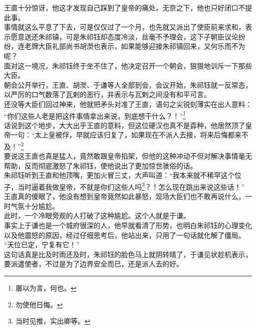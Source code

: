 \begin{multicols}{\theparacolNo}
王直十分惊讶，他这才发现自己踩到了皇帝的痛处，无奈之下，他也只好闭口不提此事。\\

事情就这么平息了下去，可是仅仅过了一个月，也先就又派出了使臣前来求和，表示愿意送还朱祁镇，可是朱祁钰却态度冷淡，丝毫不予理会，这下子朝臣议论纷纷，连老牌大臣礼部尚书胡濙也表示，如果能够迎接朱祁镇回来，又何乐而不为呢？\\

面对这一境况，朱祁钰终于坐不住了，他决定召开一个朝会，狠狠地训斥一下那些大臣。\\

朝会公开举行，王直、胡濙、于谦等人全部到会，会议开始，朱祁钰就一反常态，以严厉的口气数落了瓦剌的恶行，并表示与瓦剌之间没有和平可言。\\

还没等大臣们回过神来，他就把矛头对准了王直，语句之尖锐刻薄实在出人意料：\\

“你们这些人老是把这件事情拿出来说，到底想干什么？！”\footnote{屡以为言，何也。}\\

话说到这个地步，大大出乎王直的意料，但这位硬汉也真不是孬种，他居然顶了皇帝一句：“太上皇被俘，早就应该归复了，如果现在不派人去接，将来后悔都来不及！”\footnote{勿使他日悔。}\\

要说这王直也真是猛人，竟然敢跟皇帝掐架，但他的这种冲动不但对解决事情毫无帮助，反而彻底激怒了朱祁钰，使他说出了更加惊世骇俗的话。\\

朱祁钰听到王直和他顶嘴，更加火冒三丈，大声叫道：“我本来就不稀罕这个位子，当时逼着我做皇帝，不就是你们这些人吗\footnote{当时见推，实出卿等。}？！怎么现在跳出来说这些话！”\\

王直真的傻眼了，他没有想到皇帝竟然如此暴怒，现场大臣们也不敢再说什么，一时气氛十分尴尬。\\

此时，一个冷眼旁观的人打破了这种尴尬。这个人就是于谦。\\

事实上于谦也是一个城府很深的人，他早就看清了形势，也明白朱祁钰的心理变化以及他震怒的原因，经过仔细思考后，他站出来，只用了一句话就化解了僵局。\\

“天位已定，宁复有它！”\\

这句话真是比及时雨还及时，朱祁钰的脸色马上就阴转晴了，于谦见状趁机表示，要派遣使者，不过是为了边界安全而已，还是派人去的好。\\


\end{multicols}
